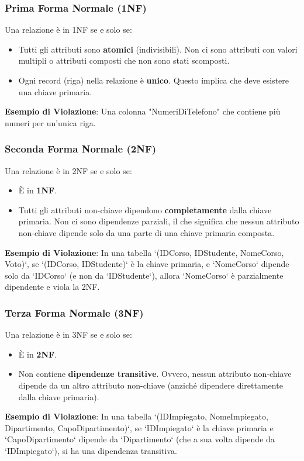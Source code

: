 \subsubsection{Prima Forma Normale (1NF)}
Una relazione è in 1NF se e solo se:
\begin{itemize}
    \item Tutti gli attributi sono \textbf{atomici} (indivisibili). Non ci sono attributi con valori multipli o attributi composti che non sono stati scomposti.
    \item Ogni record (riga) nella relazione è \textbf{unico}. Questo implica che deve esistere una chiave primaria.
\end{itemize}
\textbf{Esempio di Violazione}: Una colonna "NumeriDiTelefono" che contiene più numeri per un'unica riga.

\subsubsection{Seconda Forma Normale (2NF)}
Una relazione è in 2NF se e solo se:
\begin{itemize}
    \item È in \textbf{1NF}.
    \item Tutti gli attributi non-chiave dipendono \textbf{completamente} dalla chiave primaria. Non ci sono dipendenze parziali, il che significa che nessun attributo non-chiave dipende solo da una parte di una chiave primaria composta.
\end{itemize}
\textbf{Esempio di Violazione}: In una tabella `(IDCorso, IDStudente, NomeCorso, Voto)`, se `(IDCorso, IDStudente)` è la chiave primaria, e `NomeCorso` dipende solo da `IDCorso` (e non da `IDStudente`), allora `NomeCorso` è parzialmente dipendente e viola la 2NF.

\subsubsection{Terza Forma Normale (3NF)}
Una relazione è in 3NF se e solo se:
\begin{itemize}
    \item È in \textbf{2NF}.
    \item Non contiene \textbf{dipendenze transitive}. Ovvero, nessun attributo non-chiave dipende da un altro attributo non-chiave (anziché dipendere direttamente dalla chiave primaria).
\end{itemize}
\textbf{Esempio di Violazione}: In una tabella `(IDImpiegato, NomeImpiegato, Dipartimento, CapoDipartimento)`, se `IDImpiegato` è la chiave primaria e `CapoDipartimento` dipende da `Dipartimento` (che a sua volta dipende da `IDImpiegato`), si ha una dipendenza transitiva.

